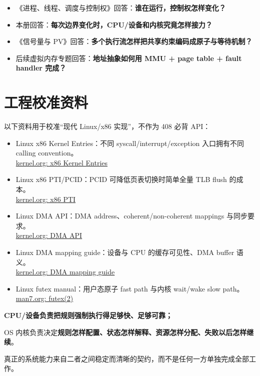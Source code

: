 \documentclass[11pt,a4paper]{ctexart}
\newcommand{\kw}[1]{\textbf{#1}}
\begin{document}
\begin{bridge}[和现有专题的连接]
\begin{itemize}
  \item 《进程、线程、调度与控制权》回答：\kw{谁在运行，控制权怎样变化？}
  \item 本册回答：\kw{每次边界变化时，CPU/设备和内核究竟怎样接力？}
  \item 《信号量与 PV》回答：\kw{多个执行流怎样把共享约束编码成原子与等待机制？}
  \item 后续虚拟内存专题回答：\kw{地址抽象如何用 MMU + page table + fault handler 完成？}
\end{itemize}
\end{bridge}

\section*{工程校准资料}
以下资料用于校准“现代 Linux/x86 实现”，不作为 408 必背 API：
\begin{itemize}
  \item Linux x86 Kernel Entries：不同 syscall/interrupt/exception 入口拥有不同 calling convention。\\
  \href{https://www.kernel.org/doc/html/v6.2/x86/entry_64.html}{kernel.org: x86 Kernel Entries}
  \item Linux x86 PTI/PCID：PCID 可降低页表切换时简单全量 TLB flush 的成本。\\
  \href{https://origin.kernel.org/doc/html/latest/arch/x86/pti.html}{kernel.org: x86 PTI}
  \item Linux DMA API：DMA address、coherent/non-coherent mappings 与同步要求。\\
  \href{https://www.kernel.org/doc/html/latest/core-api/dma-api.html}{kernel.org: DMA API}
  \item Linux DMA mapping guide：设备与 CPU 的缓存可见性、DMA buffer 语义。\\
  \href{https://www.kernel.org/doc/html/latest/core-api/dma-api-howto.html}{kernel.org: DMA mapping guide}
  \item Linux futex manual：用户态原子 fast path 与内核 wait/wake slow path。\\
  \href{https://man7.org/linux/man-pages/man2/futex.2.html}{man7.org: futex(2)}
\end{itemize}

\begin{corebox}[最终一句话]
\begin{center}
\Large\bfseries
CPU/设备负责把规则\textbf{强制执行得足够快、足够可靠}；\par
OS 内核负责决定\textbf{规则怎样配置、状态怎样解释、资源怎样分配、失败以后怎样继续}。
\end{center}
真正的系统能力来自二者之间稳定而清晰的契约，而不是任何一方单独完成全部工作。
\end{corebox}
\end{document}
